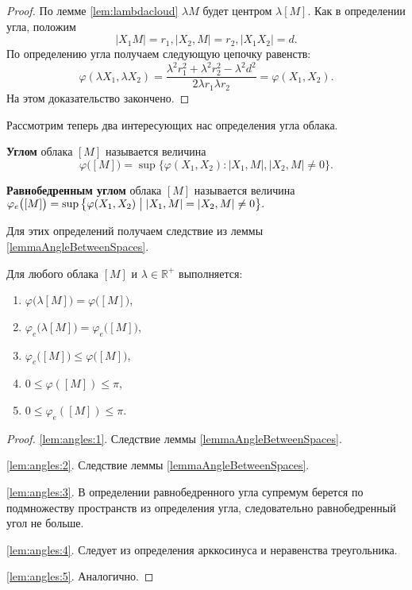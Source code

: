 \begin{proof}
  По лемме \ref{lem:lambdacloud} \( \lambda M \) будет центром \( \lambda
    [M]
  \). Как в определении угла, положим \[ |X_1 M| = r_1, | X_2, M | =r_2,
    |X_1
  X_2| = d.\] По определению угла получаем следующую цепочку
  равенств: \[ \varphi (\lambda X_1, \lambda X_2) = \frac{\lambda
    ^{2} r_1^2 + \lambda ^2 r_2^2 - \lambda^2 d^2}{2 \lambda  r_1
    \lambda r_2} =
    \varphi (X_1, X_2).
  \]
  На этом доказательство закончено.
\end{proof}
Рассмотрим теперь два интересующих нас определения угла облака.
\begin{defin}
  \textbf{Углом} облака $ [M] $ называется величина
  \[
    \varphi \big([M]\big)= \sup \big\{\varphi (X_1, X_2) \colon | X_1,M
    |, |X_2,M| \neq 0\big\}.
  \]
\end{defin}
\begin{defin}
  \textbf{Равнобедренным углом} облака $ [M] $ называется величина \(
    \varphi_e \big([M]\big) = \sup \big\{\varphi (X_1, X_2) \bigm| |X_1,M |
  = |X_2,M| \neq 0\big\}. \)
\end{defin}
Для этих определений получаем следствие из леммы \ref{lemmaAngleBetweenSpaces}.
\begin{lemma}
  Для любого облака \( [M] \) и \( \lambda \in\mathbb{R}^+ \)
  выполняется\textup{:}\label{lem:angles}
  \begin{enumerate}
    \item \(\varphi \big(\lambda [M]\big) = \varphi
      \big([M]\big)\),\label{lem:angles:1}
    \item \(\varphi_e \big(\lambda [M]\big) = \varphi_e
      \big([M]\big)\),\label{lem:angles:2}
    \item \( \varphi_e \big([M]\big) \le \varphi \big([M]\big)
      \),\label{lem:angles:3}
    \item \(0 \le \varphi ([M]) \le \pi\),\label{lem:angles:4}
    \item \(0 \le \varphi_e ([M]) \le \pi\).\label{lem:angles:5}
  \end{enumerate}
\end{lemma}
\begin{proof}
  \ref{lem:angles:1}. Следствие леммы \ref{lemmaAngleBetweenSpaces}.

  \ref{lem:angles:2}. Следствие леммы \ref{lemmaAngleBetweenSpaces}.

  \ref{lem:angles:3}. В определении равнобедренного угла супремум берется по
  подмножеству пространств из определения угла, следовательно равнобедренный
  угол не больше.

  \ref{lem:angles:4}.  Следует из определения арккосинуса и неравенства
  треугольника.

  \ref{lem:angles:5}. Аналогично.
\end{proof}
